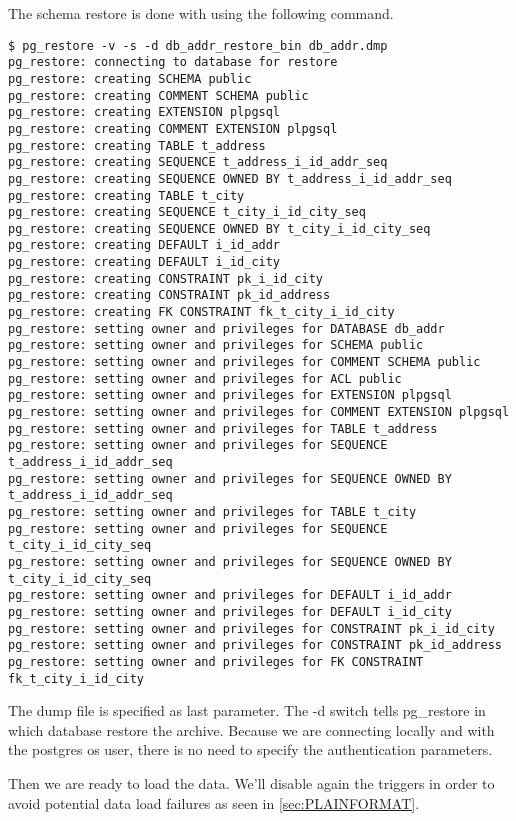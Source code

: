 The schema restore is done with using the following command.

\begin{verbatim}
$ pg_restore -v -s -d db_addr_restore_bin db_addr.dmp 
pg_restore: connecting to database for restore
pg_restore: creating SCHEMA public
pg_restore: creating COMMENT SCHEMA public
pg_restore: creating EXTENSION plpgsql
pg_restore: creating COMMENT EXTENSION plpgsql
pg_restore: creating TABLE t_address
pg_restore: creating SEQUENCE t_address_i_id_addr_seq
pg_restore: creating SEQUENCE OWNED BY t_address_i_id_addr_seq
pg_restore: creating TABLE t_city
pg_restore: creating SEQUENCE t_city_i_id_city_seq
pg_restore: creating SEQUENCE OWNED BY t_city_i_id_city_seq
pg_restore: creating DEFAULT i_id_addr
pg_restore: creating DEFAULT i_id_city
pg_restore: creating CONSTRAINT pk_i_id_city
pg_restore: creating CONSTRAINT pk_id_address
pg_restore: creating FK CONSTRAINT fk_t_city_i_id_city
pg_restore: setting owner and privileges for DATABASE db_addr
pg_restore: setting owner and privileges for SCHEMA public
pg_restore: setting owner and privileges for COMMENT SCHEMA public
pg_restore: setting owner and privileges for ACL public
pg_restore: setting owner and privileges for EXTENSION plpgsql
pg_restore: setting owner and privileges for COMMENT EXTENSION plpgsql
pg_restore: setting owner and privileges for TABLE t_address
pg_restore: setting owner and privileges for SEQUENCE t_address_i_id_addr_seq
pg_restore: setting owner and privileges for SEQUENCE OWNED BY t_address_i_id_addr_seq
pg_restore: setting owner and privileges for TABLE t_city
pg_restore: setting owner and privileges for SEQUENCE t_city_i_id_city_seq
pg_restore: setting owner and privileges for SEQUENCE OWNED BY t_city_i_id_city_seq
pg_restore: setting owner and privileges for DEFAULT i_id_addr
pg_restore: setting owner and privileges for DEFAULT i_id_city
pg_restore: setting owner and privileges for CONSTRAINT pk_i_id_city
pg_restore: setting owner and privileges for CONSTRAINT pk_id_address
pg_restore: setting owner and privileges for FK CONSTRAINT fk_t_city_i_id_city

\end{verbatim}

The dump file is specified as last parameter. The -d switch tells pg\_restore in which database restore 
the archive. Because we are connecting locally and with the postgres os user, there is no need to specify 
the authentication parameters.\newline 

Then we are ready to load the data. We'll disable again the triggers in order to avoid potential data 
load failures as seen in \ref{sec:PLAINFORMAT}.

